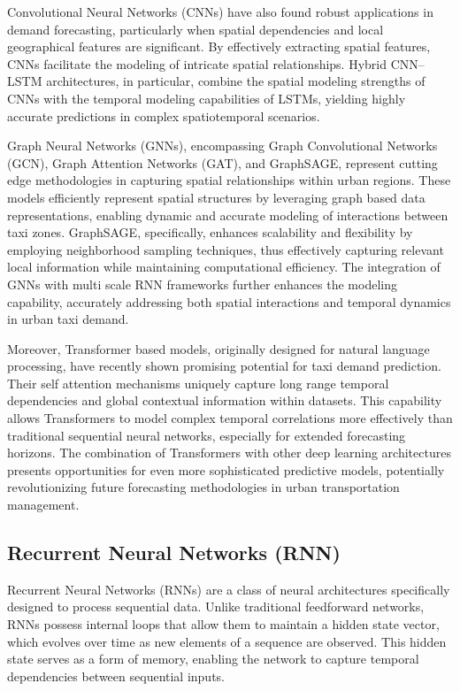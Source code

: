 \documentclass{article}
\begin{document}
Convolutional Neural Networks (CNNs) have also found robust applications in demand forecasting, particularly when spatial dependencies and local geographical features are significant\cite{ke_2019_hexagonbased}. By effectively extracting spatial features, CNNs facilitate the modeling of intricate spatial relationships. Hybrid CNN–LSTM architectures, in particular, combine the spatial modeling strengths of CNNs with the temporal modeling capabilities of LSTMs, yielding highly accurate predictions in complex spatiotemporal scenarios\cite{nazir_2024_a}.

Graph Neural Networks (GNNs), encompassing Graph Convolutional Networks (GCN), Graph Attention Networks (GAT), and GraphSAGE, represent cutting edge methodologies in capturing spatial relationships within urban regions. These models efficiently represent spatial structures by leveraging graph based data representations, enabling dynamic and accurate modeling of interactions between taxi zones\cite{sanchezlengeling_2021_a}. GraphSAGE, specifically, enhances scalability and flexibility by employing neighborhood sampling techniques, thus effectively capturing relevant local information while maintaining computational efficiency. The integration of GNNs with multi scale RNN frameworks further enhances the modeling capability, accurately addressing both spatial interactions and temporal dynamics in urban taxi demand\cite{sanchezlengeling_2021_a}.

Moreover, Transformer based models, originally designed for natural language processing, have recently shown promising potential for taxi demand prediction\cite{li_2021_intercity}. Their self attention mechanisms uniquely capture long range temporal dependencies and global contextual information within datasets. This capability allows Transformers to model complex temporal correlations more effectively than traditional sequential neural networks, especially for extended forecasting horizons\cite{li_2021_intercity}. The combination of Transformers with other deep learning architectures presents opportunities for even more sophisticated predictive models, potentially revolutionizing future forecasting methodologies in urban transportation management.

\subsection{Recurrent Neural Networks (RNN)}

Recurrent Neural Networks (RNNs) are a class of neural architectures specifically designed to process sequential data\cite{sherstinsky_fundamentals}. Unlike traditional feedforward networks, RNNs possess internal loops that allow them to maintain a hidden state vector, which evolves over time as new elements of a sequence are observed. This hidden state serves as a form of memory, enabling the network to capture temporal dependencies between sequential inputs.
\end{document}
